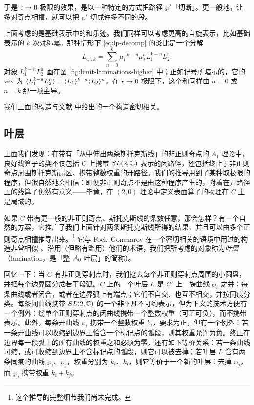 于是 $\epsilon \to 0$ 极限的效果，是以一种特定的方式把路径 $\wp'$「切断」。更一般地，让多对奇点相撞，就可以把 $\wp'$ 切成许多不同的段。

上面考虑的是基础表示中的和乐迹。我们同样可以考虑更高的自旋表示，比如基础表示的 $k$ 次对称幂。那种情形下 \eqref{eq:lp-decomp} 的类比是一个分解
\begin{equation}
 L_{\wp', k} = \sum_{n=0}^k \mu_1^{-k-n} \mu_2^{n} L_1^{k-n} L_2^n.
\end{equation}
对象 $L_1^{k-n} L_2^n$ 画在图 \ref{fig:limit-laminations-higher} 中；正如记号所暗示的，它的 vev 为 $\langle L_1^{k-n} L_2^n \rangle = \langle L_1 \rangle^{k-n} \langle L_2 \rangle^{n}$。在 $\epsilon \to 0$ 极限下，这个和同样由 $n = 0$ 或 $n = k$ 那一项主导。

我们上面的构造与文献 \cite{fgtoappear} 中给出的一个构造密切相关。

\subsection{叶层}
\label{subsec:Lams-Def}

上面我们发现：在带有「从中伸出两条斯托克斯线」的非正则奇点的 $A_1$ 理论中，良好线算子的类不仅包括 $C$ 上携带 $SL(2,\mathbb{C})$ 表示的闭路径，还包括终止于非正则奇点周围斯托克斯扇区、携带整数权重的开路径。我们的推导用到了某种取极限的程序，但很自然地会相信：即便非正则奇点不是由这种程序产生的，附着在开路径上的线算子仍然有意义——毕竟，在 $(2,0)$ 理论中定义表面算子的物理在 $C$ 上是局域的。

如果 $C$ 带有更一般的非正则奇点、斯托克斯线的条数任意，那会怎样？有一个自然的方案，它推广了我们上面针对两条斯托克斯线所得的结果，并且可以由多个正则奇点相撞推导出来。\footnote{这个推导的完整细节我们尚未完成。}
它与 Fock--Goncharov 在一个密切相关的语境中用过的构造非常相似 \cite{MR2349682}。沿用（但略有滥用）他们的术语，我们把所考虑的对象称为\emph{叶层}（lamination，是「整 $\mathcal{A}_0$-叶层」的简称）。

回忆一下：当 $C$ 有非正则穿刺点时，我们挖去每个非正则穿刺点周围的小圆盘，并把每个边界圆分成若干段弧。$C$ 上的一个叶层 $L$ 是 $C'$ 上一族曲线 $\wp_i$ 之并：每条曲线或者闭合，或者在边界弧上有端点；它们不自交、也互不相交，并按同痕分类。每条闭曲线携带 $SL(2,\mathbb{C})$ 的一个非平凡不可约表示，但为下文的技术方便有一个例外：绕单个正则穿刺点的闭曲线携带一个整数权重（可正可负），而不携带表示。此外，每条开曲线 $\wp_i$ 携带一个整数权重 $k_i$，要求为正，但有一个例外：若一条开曲线可以收缩到边界上恰含一个标记点的弧段，则其权重允许为负。终止在边界每一段弧上的所有曲线的权重之和必须为零。还有如下等价关系：若一条曲线可缩，或可收缩到边界上不含标记点的弧段，则它可以被去掉；若叶层 $L$ 含有两条同痕的曲线 $\wp_i$、$\wp_j$，权重分别为 $k_i$、$k_j$，则它等价于一个新的叶层：去掉 $\wp_j$，而 $\wp_i$ 携带权重 $k_i + k_j$。

